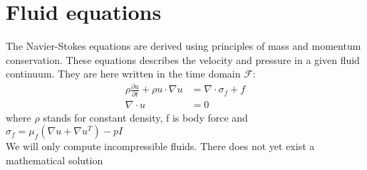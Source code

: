 \chapter*{Fluid equations}
The Navier-Stokes equations are derived using principles of mass and momentum conservation. These equations describes the velocity and pressure in a given fluid continuum. They are here written in the time domain $\mathcal{F}$:
\begin{align}
\rho\frac{\partial u}{\partial t} + \rho u \cdot \nabla u &= \nabla \cdot \sigma_f + f \\
\nabla \cdot u &= 0
\end{align}
where $ \rho$ stands for constant density, f is body force and $ \sigma_f = \mu_f (\nabla u + \nabla u^T)  - pI$ \\
We will only compute incompressible fluids.
There does not yet exist a mathematical solution




